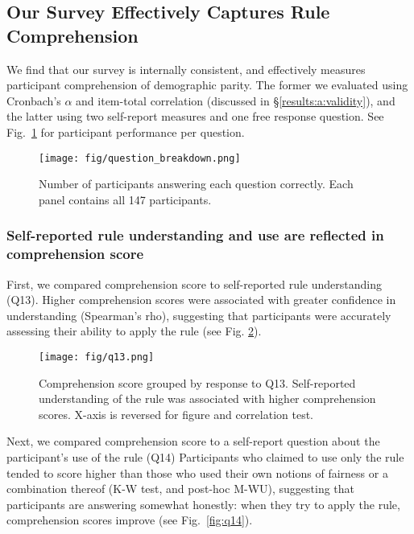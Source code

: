 \documentclass{article}
\begin{document}
\subsection{Our Survey Effectively Captures Rule Comprehension} \label{results:1:rq1}

We find that our survey is internally consistent, and effectively measures participant comprehension of demographic parity. The former we evaluated using Cronbach's $\alpha$ and item-total correlation (discussed in \S\ref{results:a:validity}), and the latter using two self-report measures and one free response question.
See Fig.~\ref{fig:question_breakdown} for participant performance per question.

\begin{figure}[h]
    \centering
    \texttt{[image: fig/question\_breakdown.png]}
    \vspace{-10pt}
    \caption{Number of participants answering each question correctly. Each panel contains all 147 participants. 
    }
    \label{fig:question_breakdown}
    \vspace{-5pt}
\end{figure}


\subsubsection{Self-reported rule understanding and use are reflected in comprehension score}
First, we compared comprehension score to self-reported rule understanding (Q13). Higher comprehension scores were associated with greater confidence in understanding (Spearman's rho), suggesting that participants were accurately assessing their ability to apply the rule (see Fig. \ref{fig:q13}).





\begin{figure}[ht]
    \centering
    \texttt{[image: fig/q13.png]}
    \vspace{-10pt}
    \caption{Comprehension score grouped by response to Q13. Self-reported understanding of the rule was associated with higher comprehension scores. X-axis is reversed for figure and correlation test.}
    \label{fig:q13}
\end{figure}



Next, we compared comprehension score to a self-report question about the participant's use of the rule (Q14)
Participants who claimed to use only the rule tended to score higher than those who used their own notions of fairness or a combination thereof (K-W test, and post-hoc M-WU), suggesting that participants are answering somewhat honestly: when they try to apply the rule, comprehension scores improve (see Fig.~\ref{fig:q14}).
\end{document}
